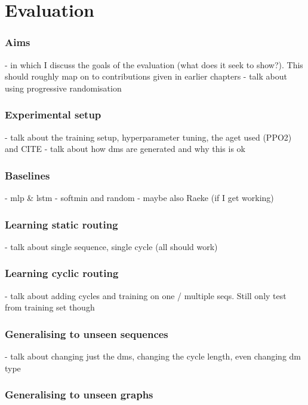 \chapter{Evaluation}
\label{chapter:evaluation}

\subsection{Aims}

- in which I discuss the goals of the evaluation (what does it seek to show?). This should roughly map on to contributions given in earlier chapters
- talk about using progressive randomisation

\subsection{Experimental setup}

- talk about the training setup, hyperparameter tuning, the aget used (PPO2) and CITE
- talk about how dms are generated and why this is ok

\subsection{Baselines}

- mlp \& lstm
- softmin and random
- maybe also Raeke (if I get working)

\subsection{Learning static routing}

- talk about single sequence, single cycle (all should work)

\subsection{Learning cyclic routing}

- talk about adding cycles and training on one / multiple seqs. Still only test from training set though

\subsection{Generalising to unseen sequences}

- talk about changing just the dms, changing the cycle length, even changing dm type

\subsection{Generalising to unseen graphs}


